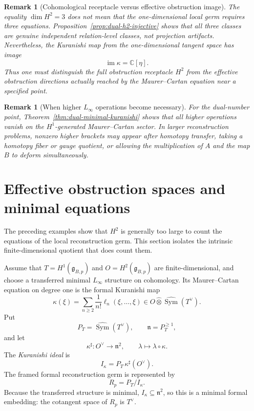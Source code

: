 \documentclass[11pt]{amsart}
\newtheorem{remark}[theorem]{Remark}
\newcommand{\C}{\mathbb C}
\newcommand{\ghoch}{\mathfrak g}
\begin{document}
\begin{remark}[Cohomological receptacle versus effective obstruction image]
The equality $\dim H^2=3$ does not mean that the one-dimensional local germ requires three equations.  Proposition~\ref{prop:dual-h2-injective} shows that all three classes are genuine independent relation-level classes, not projection artifacts.  Nevertheless, the Kuranishi map from the one-dimensional tangent space has image
\[
\operatorname{im}\kappa=\C[\eta].
\]
Thus one must distinguish the full obstruction receptacle $H^2$ from the effective obstruction directions actually reached by the Maurer--Cartan equation near a specified point.
\end{remark}

\begin{remark}[When higher $L_\infty$ operations become necessary]
For the dual-number point, Theorem~\ref{thm:dual-minimal-kuranishi} shows that all higher operations vanish on the $H^1$-generated Maurer--Cartan sector.  In larger reconstruction problems, nonzero higher brackets may appear after homotopy transfer, taking a homotopy fiber or gauge quotient, or allowing the multiplication of $A$ and the map $B$ to deform simultaneously.
\end{remark}


\section{Effective obstruction spaces and minimal equations}\label{sec:effective-obstruction}

The preceding examples show that $H^2$ is generally too large to count the equations of the local reconstruction germ.  This section isolates the intrinsic finite-dimensional quotient that does count them.

Assume that $T=H^1(\ghoch_{B,p})$ and $O=H^2(\ghoch_{B,p})$ are finite-dimensional, and choose a transferred minimal $L_\infty$ structure on cohomology.  Its Maurer--Cartan equation on degree one is the formal Kuranishi map
\[
\kappa(\xi)
=
\sum_{n\ge2}\frac1{n!}\ell_n(\xi,\ldots,\xi)
\in O\widehat\otimes \widehat{\operatorname{Sym}}(T^\vee).
\]
Put
\[
P_T=\widehat{\operatorname{Sym}}(T^\vee),
\qquad
\mathfrak n=P_T^{\ge1},
\]
and let
\[
\kappa^\sharp:O^\vee\longrightarrow\mathfrak n^2,
\qquad
\lambda\longmapsto \lambda\circ\kappa.
\]
The \emph{Kuranishi ideal} is
\[
I_\kappa=P_T\,\kappa^\sharp(O^\vee).
\]
The framed formal reconstruction germ is represented by
\[
R_p=P_T/I_\kappa.
\]
Because the transferred structure is minimal, $I_\kappa\subseteq\mathfrak n^2$, so this is a minimal formal embedding: the cotangent space of $R_p$ is $T^\vee$.
\end{document}
